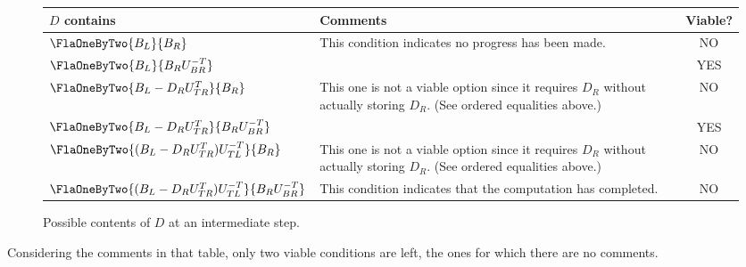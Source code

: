 \begin{figure}[htbp]
\begin{center}
\begin{tabular}{| p{2.5in} | p{3.0in} | c |} \hline
$ D $ contains & Comments & Viable?\\ \hline
\begin{minipage}{2.5in}
$
\FlaOneByTwo{ B_L }
            { B_R }
$ 
\end{minipage}
&
\begin{minipage}[c]{3in}
This condition indicates no
progress has been made.
\end{minipage}
&
NO
\\ \hline
%
%
\begin{minipage}{2.5in}
$
\FlaOneByTwo{ B_L }
            { B_{R} U_{BR}^{-T} }
$ 
\end{minipage}
& 
\begin{minipage}{3in}
\end{minipage}
&
YES
\\ \hline
%
%
\begin{minipage}{2.5in}
$
\FlaOneByTwo{ B_L - D_{R} U_{TR}^{T} }
            { B_R }
$ 
\end{minipage}
& 
\begin{minipage}{3in}
This one is not a viable option since 
it requires $ D_R $ without actually
storing $ D_R $. (See ordered equalities above.)
\end{minipage}
&
NO
\\ \hline
%
%
\begin{minipage}{2.5in}
$
\FlaOneByTwo{ B_L - D_{R} U_{TR}^{T} }
            { B_{R} U_{BR}^{-T} }
$ 
\end{minipage}
& 
\begin{minipage}{3in}
\end{minipage}
&
YES
\\ \hline
%
%
\begin{minipage}{2.5in}
$
\FlaOneByTwo{ ( B_{L} - D_R U_{TR}^{T} ) U_{TL}^{-T} }
            { B_R }
$ 
\end{minipage}
& 
\begin{minipage}{3in}
This one is not a viable option since 
it requires $ D_R $ without actually
storing $ D_R $. (See ordered equalities above.)
\end{minipage}
&
NO
\\ \hline
%
%
\begin{minipage}{2.5in}
$
\FlaOneByTwo{ ( B_L - D_R U_{TR}^{T} ) U_{TL}^{-T} }
            { B_R U_{BR}^{-T} }
$ 
\end{minipage}
& 
\begin{minipage}{3in}
This condition indicates that the computation has completed.
\end{minipage}
&
NO \\
\hline
\end{tabular}
\end{center}
\caption{Possible contents of $ D $ at 
an intermediate step.}
\label{fig:dtrsm:possibilities}
\end{figure}
Considering the comments in that table, only two viable
conditions are left, the ones for which there are no comments.

